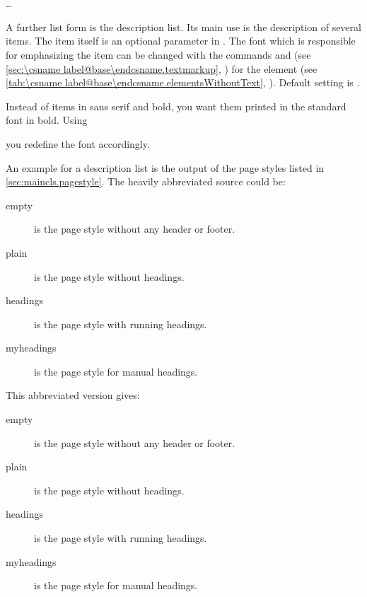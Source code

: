 \begin{Declaration}
  \\
  \quad{}\\
  \quad\dots\\
\end{Declaration}%
%
%
A further list form is the description list. Its main use is the description
of several items. The item itself is an optional parameter in
. The font%
 which is responsible for emphasizing the item can be changed with the commands
 and  (see \autoref{sec:\csname
  label@base\endcsname.textmarkup}, ) for the element
 (see
\autoref{tab:\csname label@base\endcsname.elementsWithoutText},
). Default
setting is \linebreak[2].%
\ifCommonmaincls
\begin{Example}
  \label{desc:maincls.env.description.example}%
  Instead of items in sans serif and bold, you want them printed in the
  standard font in bold. Using
\begin{lstcode}
\end{lstcode}
  you redefine the font accordingly.

  An example for a description list is the output of the page styles
  listed in \autoref{sec:maincls.pagestyle}. The heavily
  abbreviated source could be:
\begin{lstcode}
  \begin{description}
  \item[empty] is the page style without any header or footer.
    \item[plain] is the page style without headings.
    \item[headings] is the page style with running headings.
    \item[myheadings] is the page style for manual headings.
  \end{description}
\end{lstcode}
  This abbreviated version gives:
  \begin{ShowOutput}
    \begin{description}
    \item[empty] is the page style without any header or footer.
    \item[plain] is the page style without headings.
    \item[headings] is the page style with running headings.
    \item[myheadings] is the page style for manual headings.
    \end{description}
  \end{ShowOutput}
\end{Example}
